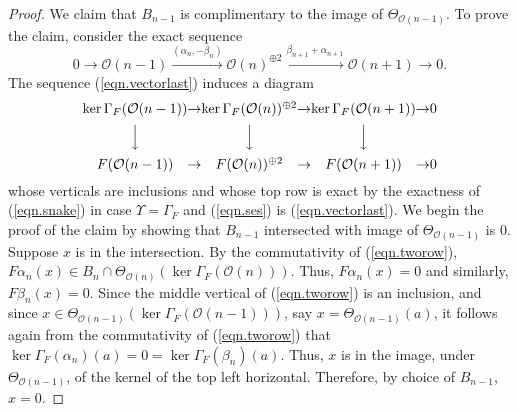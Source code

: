 \documentclass[10pt]{amsart}
\theoremstyle{definition}
\theoremstyle{remark}
\numberwithin{equation}{section}
\begin{document}
\begin{proof}
We claim that $B_{n-1}$ is complimentary to the image of $\Theta_{\mathcal{O}(n-1)}$.  To prove the claim, consider the exact sequence
\begin{equation} \label{eqn.vectorlast}
0 \longrightarrow \mathcal{O}(n-1) \overset{(\alpha_{n},-\beta_{n})}{\longrightarrow} \mathcal{O}(n)^{\oplus 2} \overset{\beta_{n+1}+\alpha_{n+1}}{\longrightarrow} \mathcal{O}(n+1) \longrightarrow 0.
\end{equation}
The sequence (\ref{eqn.vectorlast}) induces a diagram
\begin{equation} \label{eqn.tworow}
\begin{CD}
{\operatorname{ker }\Gamma_{F}} (\mathcal{O}(n-1)) & \rightarrow & {\operatorname{ker }\Gamma_{F}} (\mathcal{O}(n))^{\oplus 2} & \rightarrow & {\operatorname{ker }\Gamma_{F}}(\mathcal{O}(n+1)) & \rightarrow & 0  \\
@VVV @VVV @VVV \\
F(\mathcal{O}(n-1)) & \rightarrow & F(\mathcal{O}(n))^{\oplus 2} & \rightarrow & F(\mathcal{O}(n+1)) & \rightarrow & 0
\end{CD}
\end{equation}
whose verticals are inclusions and whose top row is exact by the exactness of (\ref{eqn.snake}) in case $\Upsilon=\Gamma_{F}$ and (\ref{eqn.ses}) is (\ref{eqn.vectorlast}).  We begin the proof of the claim by showing that $B_{n-1}$ intersected with image of $\Theta_{\mathcal{O}(n-1)}$ is $0$.  Suppose $x$ is in the intersection.  By the commutativity of (\ref{eqn.tworow}), $F\alpha_{n}(x) \in B_{n} \cap \Theta_{\mathcal{O}(n)}({\operatorname{ker }\Gamma_{F}}(\mathcal{O}(n)))$.  Thus, $F\alpha_{n}(x)=0$ and similarly, $F\beta_{n}(x)=0$.  Since the middle vertical of (\ref{eqn.tworow}) is an inclusion, and since $x \in \Theta_{\mathcal{O}(n-1)}({\operatorname{ker }\Gamma_{F}}(\mathcal{O}(n-1)))$, say $x=\Theta_{\mathcal{O}(n-1)}(a)$, it follows again from the commutativity of (\ref{eqn.tworow}) that ${\operatorname{ker }\Gamma_{F}} (\alpha_{n})(a)=0={\operatorname{ker }\Gamma_{F}} (\beta_{n})(a)$.  Thus, $x$ is in the image, under $\Theta_{\mathcal{O}(n-1)}$, of the kernel of the top left horizontal.  Therefore, by choice of $B_{n-1}$, $x=0$.


\end{proof}
\end{document}
